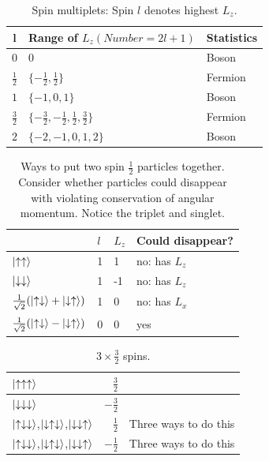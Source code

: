 \documentclass[]{article}
\begin{document}
\begin{table}[H]
	\begin{center}
		\caption{Spin multiplets: Spin $l$ denotes highest $L_z$.}
		\begin{tabular}{|c|l|l|} \hline
		$\textbf{l}$&\textbf{Range} of $L_z (Number=2l+1)$&\textbf{Statistics}\\ \hline
		$0$&$0$& Boson\\ \hline
		$\frac{1}{2}$&$\{-\frac{1}{2},\frac{1}{2}\}$& Fermion\\ \hline
		$1$&$\{-1,0,1\}$&Boson \\ \hline
		$\frac{3}{2}$&$\{-\frac{3}{2},-\frac{1}{2},\frac{1}{2},\frac{3}{2}\}$&Fermion \\ \hline
		$2$&$\{-2,-1,0,1,2\}$&Boson \\ \hline
		\end{tabular}
	\end{center}
\end{table}

\begin{table}[H]
	\begin{center}
		\caption[Ways to put two spin $\frac{1}{2}$ particles together]{Ways to put two spin $\frac{1}{2}$ particles together. Consider whether particles could disappear with violating conservation of angular momentum. Notice the triplet and singlet.} 
		\begin{tabular}{|l|l|l|l|}\hline
			&$l$&$L_z$&Could disappear?\\ \hline
			$\ket{\uparrow\uparrow}$ &1&1&no: has $L_z$\\ \hline
			$\ket{\downarrow\downarrow}$&1&-1&no: has $L_z$ \\ \hline
			$\frac{1}{\sqrt{2}}(\ket{\uparrow\downarrow}+\ket{\downarrow\uparrow})$ &1&0&no: has $L_x$\\ \hline
			$\frac{1}{\sqrt{2}}(\ket{\uparrow\downarrow}-\ket{\downarrow\uparrow})$ &0&0&yes\\ \hline
		\end{tabular}
	\end{center}
\end{table}


\begin{table}[H]
	\begin{center}
		\caption{$3 \times \frac{3}{2}$ spins.}
		\begin{tabular}{|l|r|c|}\hline
			$\ket{\uparrow\uparrow\uparrow}$&$\frac{3}{2}$& \\ \hline
			$\ket{\downarrow\downarrow\downarrow}$&$-\frac{3}{2}$& \\ \hline
			$\ket{\uparrow\downarrow\downarrow}$,$\ket{\downarrow\uparrow\downarrow}$,$\ket{\downarrow\downarrow\uparrow}$&$\frac{1}{2}$&Three ways to do this\\ \hline
			$\ket{\uparrow\downarrow\downarrow}$,$\ket{\downarrow\uparrow\downarrow}$,$\ket{\downarrow\downarrow\uparrow}$&$-\frac{1}{2}$&Three ways to do this\\ \hline
		\end{tabular}
	\end{center}
\end{table}
\end{document}
